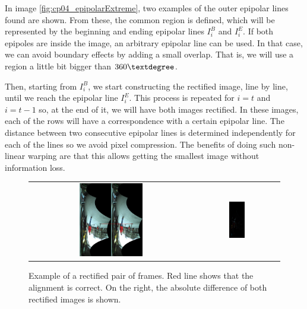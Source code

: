 \FloatBarrier

In image \ref{fig:cp04_epipolarExtreme}, two examples of the outer epipolar lines found are shown. From these, the common region is defined, which will be represented by the beginning and ending epipolar lines $I_i^B$ and $I_i^E$. If both epipoles are inside the image, an arbitrary epipolar line can be used. In that case, we can avoid boundary effects by adding a small overlap. That is, we will use a region a little bit bigger than $360\textdegree$.

Then, starting from $I_i^B$, we start constructing the rectified image, line by line, until we reach the epipolar line $I_i^E$. This process is repeated for $i=t$ and $i=t-1$ so, at the end of it, we will have both images rectified. In these images, each of the rows will have a correspondence with a certain epipolar line. The distance between two consecutive epipolar lines is determined independently for each of the lines so we avoid pixel compression. The benefits of doing such non-linear warping are that this allows getting the smallest image without information loss.

\begin{figure}[h!]
    \centering
    \begin{tabular}{ cc }
      \includegraphics[width=0.4\textwidth]{polarRectification}\label{fig:cp04_polarRectification} &
      \includegraphics[width=0.2\textwidth]{polarDiff}\label{fig:cp04_polarDiff}
    \end{tabular}
  \caption{Example of a rectified pair of frames. Red line shows that the alignment is correct. On the right, the absolute difference of both rectified images is shown.}\label{fig:cp04_polarRectification_example}
\end{figure}


